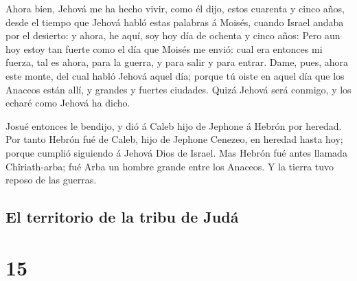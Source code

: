  Ahora bien, Jehová me ha hecho vivir, como él dijo,
estos cuarenta y cinco años, desde el tiempo que Jehová habló estas
palabras á Moisés, cuando Israel andaba por el desierto: y ahora, he
aquí, soy hoy día de ochenta y cinco años:  Pero aun hoy
estoy tan fuerte como el día que Moisés me envió: cual era entonces mi
fuerza, tal es ahora, para la guerra, y para salir y para entrar.
 Dame, pues, ahora este monte, del cual habló Jehová
aquel día; porque tú oiste en aquel día que los Anaceos están allí, y
grandes y fuertes ciudades. Quizá Jehová será conmigo, y los echaré como
Jehová ha dicho.

 Josué entonces le bendijo, y dió á Caleb hijo de Jephone
á Hebrón por heredad.  Por tanto Hebrón fué de Caleb,
hijo de Jephone Cenezeo, en heredad hasta hoy; porque cumplió siguiendo
á Jehová Dios de Israel.  Mas Hebrón fué antes llamada
Chîriath-arba; fué Arba un hombre grande entre los Anaceos. Y la tierra
tuvo reposo de las guerras.

\hypertarget{el-territorio-de-la-tribu-de-juduxe1}{%
\subsection{El territorio de la tribu de
Judá}\label{el-territorio-de-la-tribu-de-juduxe1}}

\hypertarget{section-06-15}{%
\section{15}\label{section-06-15}}

